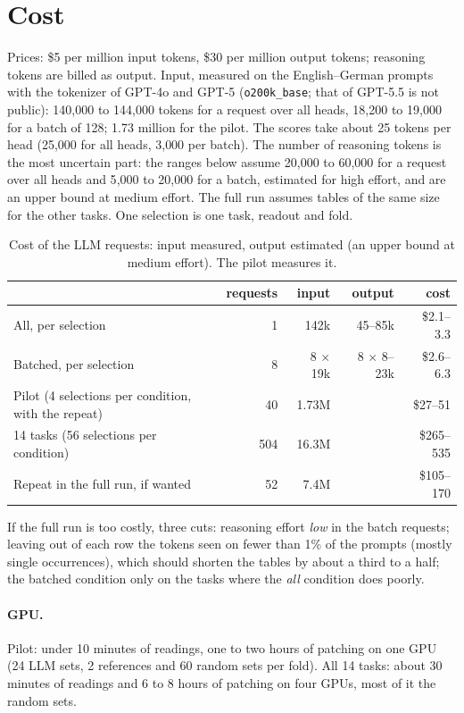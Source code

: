 \documentclass[11pt,a4paper]{article}
\begin{document}
\section{Cost}\label{sec:cost}

Prices: \$5 per million input tokens, \$30 per million output tokens; reasoning tokens are billed as output. Input, measured on the English--German prompts with the tokenizer of GPT-4o and GPT-5 (\texttt{o200k\_base}; that of GPT-5.5 is not public): 140{,}000 to 144{,}000 tokens for a request over all heads, 18{,}200 to 19{,}000 for a batch of 128; 1.73 million for the pilot. The scores take about 25 tokens per head (25{,}000 for all heads, 3{,}000 per batch). The number of reasoning tokens is the most uncertain part: the ranges below assume 20{,}000 to 60{,}000 for a request over all heads and 5{,}000 to 20{,}000 for a batch, estimated for high effort, and are an upper bound at medium effort. The full run assumes tables of the same size for the other tasks. One selection is one task, readout and fold.

\begin{table}[H]
\centering\small
\begin{tabular}{@{}lrrrr@{}}
\toprule
 & requests & input & output & cost \\
\midrule
All, per selection & 1 & 142k & 45--85k & \$2.1--3.3 \\
Batched, per selection & 8 & 8 $\times$ 19k & 8 $\times$ 8--23k & \$2.6--6.3 \\
\midrule
Pilot (4 selections per condition, with the repeat) & 40 & 1.73M & & \$27--51 \\
14 tasks (56 selections per condition) & 504 & 16.3M & & \$265--535 \\
Repeat in the full run, if wanted & 52 & 7.4M & & \$105--170 \\
\bottomrule
\end{tabular}
\caption{Cost of the LLM requests: input measured, output estimated (an upper bound at medium effort). The pilot measures it.}
\label{tab:cost}
\end{table}

If the full run is too costly, three cuts: reasoning effort \emph{low} in the batch requests; leaving out of each row the tokens seen on fewer than 1\% of the prompts (mostly single occurrences), which should shorten the tables by about a third to a half; the batched condition only on the tasks where the \emph{all} condition does poorly.

\paragraph{GPU.} Pilot: under 10 minutes of readings, one to two hours of patching on one GPU (24 LLM sets, 2 references and 60 random sets per fold). All 14 tasks: about 30 minutes of readings and 6 to 8 hours of patching on four GPUs, most of it the random sets.
\end{document}

